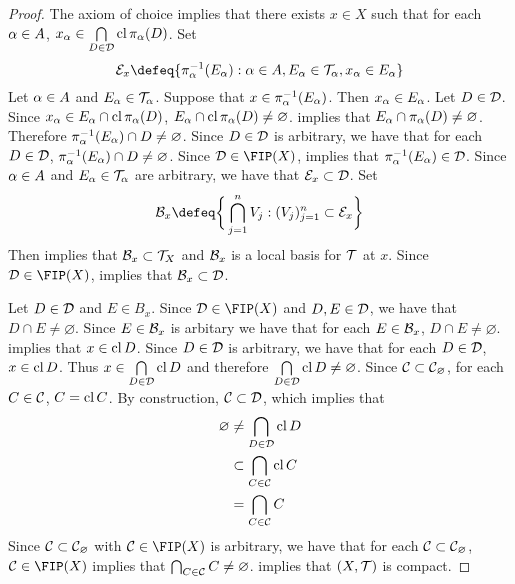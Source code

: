\documentclass{book}
\begin{document}
\begin{proof}
		The axiom of choice implies that there exists $x \in X$ such that for each $\alpha \in A$, $x_{\alpha} \in \bigcap\limits_{D \in \mathcal{D}} \operatorname{cl} \pi_{\alpha}(D)$. Set 
		$$\ME_x \defeq \{\pi_{\al}^{-1}(E_{\al}): \al \in A, E_{\al} \in \MT_{\al}, x_{\al} \in E_{\al}\}$$ 
		Let $\alpha \in A$ and $E_{\alpha} \in \mathcal{T}_{\alpha}$. Suppose that $x \in \pi_{\alpha}^{-1}(E_{\alpha})$. Then $x_{\alpha} \in E_{\alpha}$. Let $D \in \mathcal{D}$. Since $x_{\alpha} \in  E_{\alpha} \cap \operatorname{cl} \pi_{\alpha}(D)$, $ E_{\alpha} \cap \operatorname{cl} \pi_{\alpha}(D) \neq \varnothing$.  implies that $ E_{\alpha} \cap \pi_{\alpha}(D) \neq \varnothing$. Therefore $\pi_{\alpha}^{-1}(E_{\alpha}) \cap D \neq \varnothing$. Since $D \in \mathcal{D}$ is arbitrary, we have that for each $D \in \mathcal{D}$, $\pi_{\alpha}^{-1}(E_{\alpha}) \cap D \neq \varnothing$. Since $\MD \in \FIP(X)$,  implies that $\pi_{\alpha}^{-1}(E_{\alpha}) \in \mathcal{D}$. Since $\alpha \in A$ and $E_{\alpha} \in \mathcal{T}_{\alpha}$ are arbitrary, we have that $\mathcal{E}_x \subset \mathcal{D}$. Set 
		$$\MB_x \defeq \bigg \{\bigcap_{j=1}^n V_j:(V_j)_{j=1}^n \subset \ME_x \bigg \}$$ 
		Then  implies that $\mathcal{B}_x \subset \mathcal{T}_X $ and $\mathcal{B}_x$ is a local basis for $\mathcal{T}$ at $x$. Since $\MD \in \FIP(X)$,  implies that $\mathcal{B}_x \subset \mathcal{D}$. 
		
		Let $D \in \mathcal{D}$ and $E \in B_x$. Since $\MD \in \FIP(X)$ and $D, E \in \mathcal{D}$, we have that $D \cap E \neq \varnothing$. Since $E \in \mathcal{B}_x$ is arbitary we have that for each $E \in \mathcal{B}_x$, $D \cap E \neq \varnothing$.  implies that $x \in \operatorname{cl} D$. Since $D \in \mathcal{D}$ is arbitrary, we have that for each $D \in \mathcal{D}$, $x \in \operatorname{cl} D$. Thus $x \in \bigcap\limits_{D \in \mathcal{D}} \operatorname{cl} D $ and therefore $\bigcap\limits_{D \in \mathcal{D}} \operatorname{cl} D \neq \varnothing$. Since $\mathcal{C} \subset \mathcal{C}_{\varnothing}$, for each $C \in \mathcal{C}$, $C = \operatorname{cl} C$. By construction, $\mathcal{C} \subset \mathcal{D}$, which implies that 
		\begin{align*}
			\varnothing
			& \neq \bigcap_{D \in \mathcal{D}} \operatorname{cl} D \\
			& \subset \bigcap_{C \in \mathcal{C}} \operatorname{cl} C \\
			& = \bigcap_{C \in \mathcal{C}} C 
		\end{align*}
		Since $\mathcal{C} \subset \mathcal{C}_{\varnothing}$ with $\MC \in \FIP(X)$ is arbitrary, we have that for each $\mathcal{C} \subset \mathcal{C}_{\varnothing}$, $\MC \in \FIP(X)$ implies that $\bigcap_{C \in \mathcal{C}} C \neq \varnothing$.  implies that $(X, \mathcal{T})$ is compact.
 	\end{proof}
 
\end{document}
